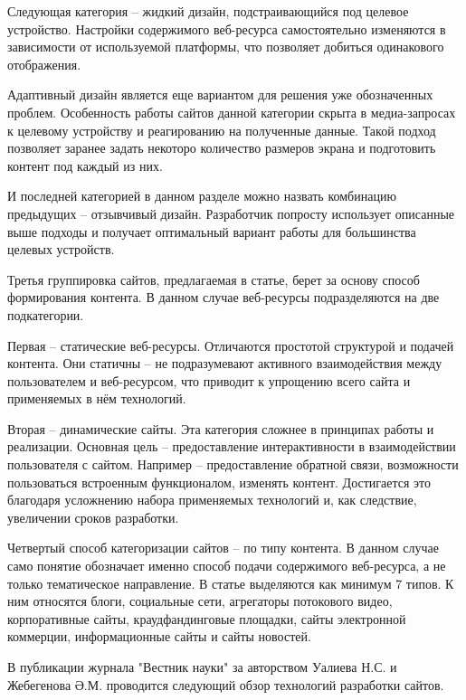 Следующая категория -- жидкий дизайн, подстраивающийся под целевое устройство.
Настройки содержимого веб-ресурса самостоятельно изменяются в зависимости от используемой платформы, что позволяет добиться одинакового отображения.

Адаптивный дизайн является еще вариантом для решения уже обозначенных проблем.
Особенность работы сайтов данной категории скрыта в медиа-запросах к целевому устройству и реагированию на полученные данные.
Такой подход позволяет заранее задать некоторо количество размеров экрана и подготовить контент под каждый из них.

И последней категорией в данном разделе можно назвать комбинацию предыдущих -- отзывчивый дизайн.
Разработчик попросту использует описанные выше подходы и получает оптимальный вариант работы для большинства целевых устройств.


Третья группировка сайтов, предлагаемая в статье, берет за основу способ формирования контента.
В данном случае веб-ресурсы подразделяются на две подкатегории.

Первая -- статические веб-ресурсы.
Отличаются простотой структурой и подачей контента.
Они статичны -- не подразумевают активного взаимодействия между пользователем и веб-ресурсом, что приводит к упрощению всего сайта и применяемых в нём технологий.

Вторая -- динамические сайты.
Эта категория сложнее в принципах работы и реализации.
Основная цель -- предоставление интерактивности в взаимодействии пользователя с сайтом.
Например -- предоставление обратной связи, возможности пользоваться встроенным функционалом, изменять контент.
Достигается это благодаря усложнению набора применяемых технологий и, как следствие, увеличении сроков разработки.


Четвертый способ категоризации сайтов -- по типу контента.
В данном случае само понятие обозначает именно способ подачи содержимого веб-ресурса, а не только тематическое направление.
В статье выделяются как минимум 7 типов.
К ним относятся блоги, социальные сети, агрегаторы потокового видео, корпоративные сайты, краудфандинговые площадки, сайты электронной коммерции, информационные сайты и сайты новостей.


В публикации журнала "Вестник науки" за авторством Уалиева Н.С. и Жебегенова Ә.М. \cite{ualiev-jebegenov-issledovanie} проводится следующий обзор технологий разработки сайтов.

